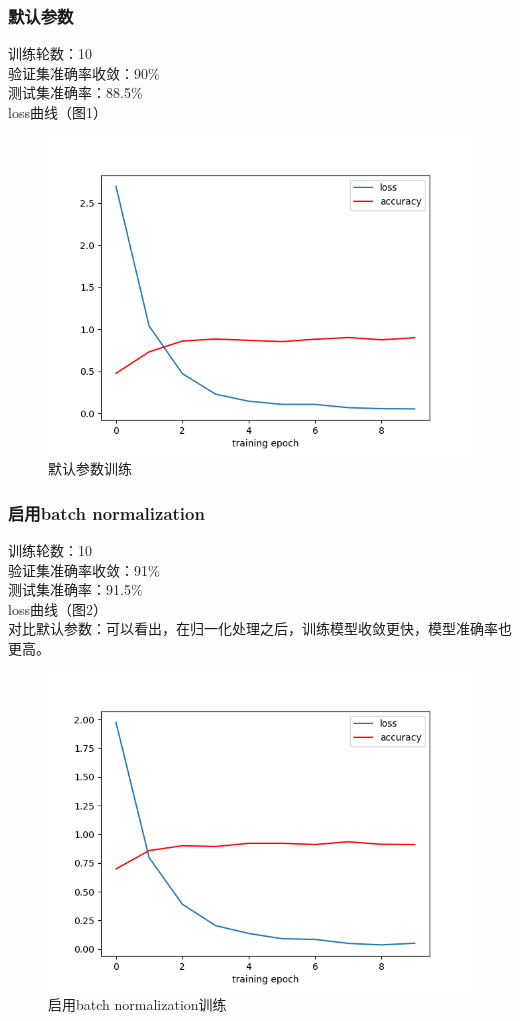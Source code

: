 \documentclass[a4paper]{article}
\begin{document}
\subsubsection{默认参数}
训练轮数：10\\
验证集准确率收敛：90\%\\
测试集准确率：88.5\%\\
loss曲线（图1）\\
\begin{figure}
    \centering
    \includegraphics[width=12cm]{Fig1.png}
    \caption{默认参数训练}
\end{figure}

\subsubsection{启用batch normalization}
训练轮数：10\\
验证集准确率收敛：91\%\\
测试集准确率：91.5\%\\
loss曲线（图2）\\
对比默认参数：可以看出，在归一化处理之后，训练模型收敛更快，模型准确率也更高。\\
\begin{figure}
    \centering
    \includegraphics[width=12cm]{Fig2.png}
    \caption{启用batch normalization训练}
\end{figure}
\end{document}
